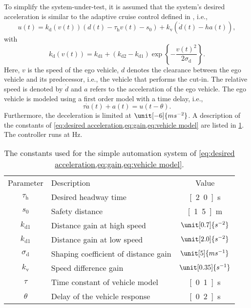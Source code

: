 To simplify the system-under-test, it is assumed that the system's desired acceleration is similar to the adaptive cruise control defined in \cite{deGelder2017assessment}, i.e.,
\begin{equation}
	\label{eq:desired acceleration} 
	u(t) = k_{\mathrm{d}}(v(t))(d(t) - \tau_{\mathrm{h}} v(t) - s_0) + k_{\mathrm{v}}\left(\dot{d}(t) - ha(t) \right),
\end{equation}
with
\begin{equation}
	\label{eq:gain}
	k_{\mathrm{d}}(v(t)) = k_{\mathrm{d1}} + \left( k_{\mathrm{d2}} - k_{\mathrm{d1}} \right) \exp \left\{ -\frac{v(t)^2}{2\sigma_{\mathrm{d}}} \right\}.
\end{equation}
Here, $v$ is the speed of the ego vehicle, $d$ denotes the clearance between the ego vehicle and its predecessor, i.e., the vehicle that performs the cut-in. The relative speed is denoted by $\dot{d}$ and $a$ refers to the acceleration of the ego vehicle. The ego vehicle is modeled using a first order model with a time delay, i.e.,
\begin{equation}
	\label{eq:vehicle model}
	\tau \dot{a}(t) + a(t) = u(t - \theta).
\end{equation}
Furthermore, the deceleration is limited at $\unit[-6]{ms^{-2}}$. A description of the constants of \cref{eq:desired acceleration,eq:gain,eq:vehicle model} are listed in \cref{tab:constants}. The controller runs at \unit[100]{Hz}.

\begin{table}
	\centering
	\caption{The constants used for the simple automation system of \cref{eq:desired acceleration,eq:gain,eq:vehicle model}.}
	\label{tab:constants}
	\begin{tabular}{clc}
		\toprule
		Parameter & Description & Value \\ \otoprule
		$\tau_{\mathrm{h}}$ & Desired headway time & \unit[2.0]{s} \\
		$s_0$ & Safety distance & \unit[1.5]{m} \\
		$k_{\mathrm{d1}}$ & Distance gain at high speed & $\unit[0.7]{s^{-2}}$ \\
		$k_{\mathrm{d1}}$ & Distance gain at low speed & $\unit[2.0]{s^{-2}}$ \\
		$\sigma_{\mathrm{d}}$ & Shaping coefficient of distance gain & $\unit[5]{ms^{-1}}$ \\
		$k_{\mathrm{v}}$ & Speed difference gain & $\unit[0.35]{s^{-1}}$ \\
		$\tau$ & Time constant of vehicle model & \unit[0.1]{s} \\
		$\theta$ & Delay of the vehicle response & \unit[0.2]{s} \\
		\bottomrule
	\end{tabular}
\end{table}

